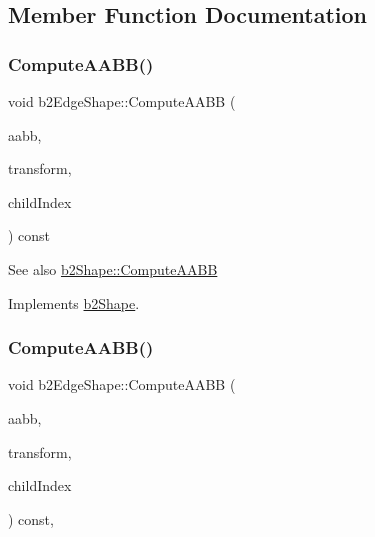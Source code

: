 \subsection{Member Function Documentation}
\mbox{\label{classb2EdgeShape_a5dfd37551fa381767374faf0df79c6af}} 
\subsubsection{\texorpdfstring{Compute\+A\+A\+B\+B()}{ComputeAABB()}\hspace{0.1cm}{\footnotesize\ttfamily [1/2]}}
{\footnotesize\ttfamily void b2\+Edge\+Shape\+::\+Compute\+A\+A\+BB (\begin{DoxyParamCaption}\item[{\hyperlink{structb2AABB}{b2\+A\+A\+BB} $\ast$}]{aabb,  }\item[{const \hyperlink{structb2Transform}{b2\+Transform} \&}]{transform,  }\item[{int32}]{child\+Index }\end{DoxyParamCaption}) const\hspace{0.3cm}{\ttfamily [virtual]}}

\begin{DoxySeeAlso}{See also}
\hyperlink{classb2Shape_a88e9807fab0c8ca9a98d8926e50a1411}{b2\+Shape\+::\+Compute\+A\+A\+BB} 
\end{DoxySeeAlso}


Implements \hyperlink{classb2Shape_a88e9807fab0c8ca9a98d8926e50a1411}{b2\+Shape}.

\mbox{\label{classb2EdgeShape_a238139ae1736b457d77443133ff16854}} 
\subsubsection{\texorpdfstring{Compute\+A\+A\+B\+B()}{ComputeAABB()}\hspace{0.1cm}{\footnotesize\ttfamily [2/2]}}
{\footnotesize\ttfamily void b2\+Edge\+Shape\+::\+Compute\+A\+A\+BB (\begin{DoxyParamCaption}\item[{\hyperlink{structb2AABB}{b2\+A\+A\+BB} $\ast$}]{aabb,  }\item[{const \hyperlink{structb2Transform}{b2\+Transform} \&}]{transform,  }\item[{int32}]{child\+Index }\end{DoxyParamCaption}) const\hspace{0.3cm}{\ttfamily [override]}, {\ttfamily [virtual]}}

